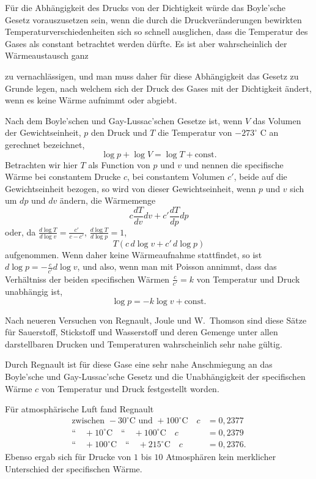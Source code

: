 \documentclass[12pt,a4paper]{article}
\begin{document}
F\"ur die Abh\"angigkeit des Drucks von der Dichtigkeit w\"urde das Boyle'sche Gesetz vorauszusetzen sein, wenn die durch die Druckver\"anderungen bewirkten Temperaturverschiedenheiten sich so schnell ausglichen, dass die Temperatur des Gases als constant betrachtet werden d\"urfte. Es ist aber wahrscheinlich der W\"armeaustausch ganz

zu vernachl\"assigen, und man muss daher f\"ur diese Abh\"angigkeit das Gesetz zu Grunde legen, nach welchem sich der Druck des Gases mit der Dichtigkeit \"andert, wenn es keine W\"arme aufnimmt oder abgiebt.

Nach dem Boyle'schen und Gay-Lussac'schen Gesetze ist, wenn $V$ das Volumen der Gewichtseinheit, $p$ den Druck und $T$ die Temperatur von $-273^{\circ}$ C an gerechnet bezeichnet,
\[
\log p + \log V = \log T + \text{const.}
\]
Betrachten wir hier $T$ als Function von $p$ und $v$ und nennen die specifische W\"arme bei constantem Drucke $c$, bei constantem Volumen $c'$, beide auf die Gewichtseinheit bezogen, so wird von dieser Gewichtseinheit, wenn $p$ und $v$ sich um $dp$ und $dv$ \"andern, die W\"armemenge
\[
c\frac{dT}{dv}dv + c'\frac{dT}{dp}dp
\]
oder, da $\frac{d\log T}{d\log v} = \frac{c'}{c-c'}$, $\frac{d\log T}{d\log p} = 1$,
\[
T(c\,d\log v + c'\,d\log p)
\]
aufgenommen. Wenn daher keine W\"armeaufnahme stattfindet, so ist $d\log p = -\frac{c}{c'}d\log v$, und also, wenn man mit Poisson annimmt, dass das Verh\"altniss der beiden specifischen W\"armen $\frac{c}{c'} = k$ von Temperatur und Druck unabh\"angig ist,
\[
\log p = -k\log v + \text{const.}
\]

Nach neueren Versuchen von Regnault, Joule und W.~Thomson sind diese S\"atze f\"ur Sauerstoff, Stickstoff und Wasserstoff und deren Gemenge unter allen darstellbaren Drucken und Temperaturen wahrscheinlich sehr nahe g\"ultig.

Durch Regnault ist f\"ur diese Gase eine sehr nahe Anschmiegung an das Boyle'sche und Gay-Lussac'sche Gesetz und die Unabh\"angigkeit der specifischen W\"arme $c$ von Temperatur und Druck festgestellt worden.

F\"ur atmosph\"arische Luft fand Regnault
\begin{align*}
\text{zwischen } -30^{\circ}\text{C und } +100^{\circ}\text{C} \quad c &= 0{,}2377\\
\text{``}\quad +10^{\circ}\text{C}\quad\text{``}\quad +100^{\circ}\text{C} \quad c &= 0{,}2379\\
\text{``}\quad +100^{\circ}\text{C}\quad\text{``}\quad +215^{\circ}\text{C} \quad c &= 0{,}2376.
\end{align*}
Ebenso ergab sich f\"ur Drucke von $1$ bis $10$ Atmosph\"aren kein merklicher Unterschied der specifischen W\"arme.
\end{document}
